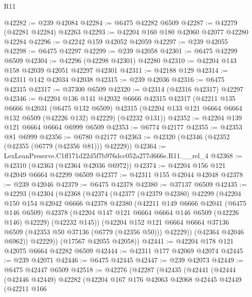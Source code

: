 \begin{lexlean}{R11}
\begin{coremodule}
@42282 := @239 @42084
@42284 := @6475 @42282 @6509
@42287 := @42279 (@42281 @42284) @42263
@42293 := @42204 @160 @180 @42060 @42077 @42280 @42284
@42296 := @42242 @159 @42052 @42059
@42297 := @239 @42055
@42298 := @6475 @42297
@42299 := @239 @42058
@42301 := @6475 @42299 @6509
@42304 := @42296 (@42298 @42301) @42280
@42310 := @42204 @143 @158 @42039 @42051 @42297 @42301
@42311 := @42188 @129
@42314 := @42311 @142 @42034 @42038
@42315 := @239 @42036
@42316 := @6475 @42315
@42317 := @37300 @6509
@42320 := @42314 (@42316 @42317) @42297
@42346 := @42204
    @136
    @141
    @42032
    @6666
    @42315
    @42317
    (@42211
      @135
      @6666
      @42031
      (@6475 @132 @6509)
      @42315
      (@42204 @133 @121 @6664 @6664 @132 @6509 (@42226 @132) @42229)
      (@42232 @131))
@42352 := @42204 @139 @121 @6664 @6664 @6999 @6509
@42353 := @6774 @42177
@42355 := @42353 @81 @6999
@42356 := @6780 @42177
@42363 := @42320 (@42346 (@42352 (@42355 (@6779 (@42356 @81))) @42229))
@42364 := LexLeanPreserve.C1ff171d22d5f7b976dcc052a277d666e.R11.__rel_4
@42368 := @42310 (@42363 (@42364 @42036 @6972))
@42374 := @42204 @156 @121 @42049 @6664 @42299 @6509
@42377 := @42311 @155 @42044 @42048
@42378 := @239 @42046
@42379 := @6475 @42378
@42380 := @37137 @6509
@42435 := @42293
    (@42304
      (@42368
        (@42374
          (@42377
            (@42379 @42380)
            @42299
            (@42204
              @150
              @154
              @42042
              @6666
              @42378
              @42380
              (@42211
                @149
                @6666
                @42041
                (@6475 @146 @6509)
                @42378
                (@42204 @147 @121 @6664 @6664 @146 @6509 (@42226 @146) @42229)
                (@42232 @145))
              (@42204
                @152
                @121
                @6664
                @6664
                @37136
                @6509
                (@42353 @50 @37136 (@6779 (@42356 @50)))
                @42229))
            (@42364 @42046 @6962))
          @42229))
      (@17567 @42055 @42058))
@42441 := @42204 @178 @121 @42075 @6664 @42282 @6509
@42444 := @42311 @177 @42069 @42074
@42445 := @239 @42071
@42446 := @6475 @42445
@42447 := @239 @42073
@42449 := @6475 @42447 @6509
@42518 := @42276
    (@42287
      (@42435
        (@42441
          (@42444
            (@42446 @42449)
            @42282
            (@42204
              @167
              @176
              @42063
              @42068
              @42445
              @42449
              (@42211
                @166

\end{coremodule}
\end{lexlean}
